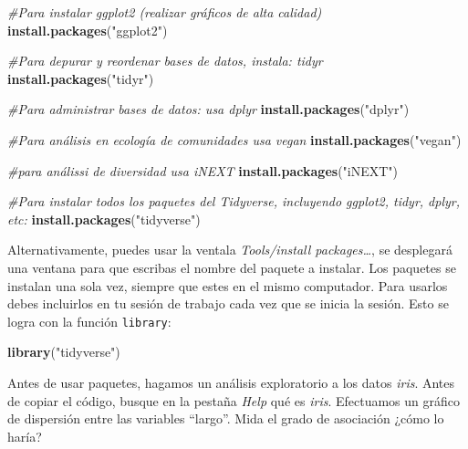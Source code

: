 \documentclass[]{article}
\newenvironment{Shaded}{\begin{snugshade}}{\end{snugshade}}
\newcommand{\CommentTok}[1]{\textcolor[rgb]{0.56,0.35,0.01}{\textit{#1}}}
\newcommand{\KeywordTok}[1]{\textcolor[rgb]{0.13,0.29,0.53}{\textbf{#1}}}
\newcommand{\NormalTok}[1]{#1}
\newcommand{\OperatorTok}[1]{\textcolor[rgb]{0.81,0.36,0.00}{\textbf{#1}}}
\newcommand{\StringTok}[1]{\textcolor[rgb]{0.31,0.60,0.02}{#1}}
\begin{document}
\begin{Shaded}
\begin{Highlighting}[]
\CommentTok{#Para instalar ggplot2 (realizar gráficos de alta calidad)}
\KeywordTok{install.packages}\NormalTok{(}\StringTok{"ggplot2"}\NormalTok{)}

\CommentTok{#Para depurar y reordenar bases de datos, instala: tidyr}
\KeywordTok{install.packages}\NormalTok{(}\StringTok{"tidyr"}\NormalTok{)}

\CommentTok{#Para administrar bases de datos: usa dplyr}
\KeywordTok{install.packages}\NormalTok{(}\StringTok{"dplyr"}\NormalTok{)}

\CommentTok{#Para análisis en ecología de comunidades usa vegan}
\KeywordTok{install.packages}\NormalTok{(}\StringTok{"vegan"}\NormalTok{)}

\CommentTok{#para análissi de diversidad usa iNEXT}
\KeywordTok{install.packages}\NormalTok{(}\StringTok{"iNEXT"}\NormalTok{)}

\CommentTok{#Para instalar todos los paquetes del Tidyverse, incluyendo ggplot2, tidyr, dplyr, etc:}
\KeywordTok{install.packages}\NormalTok{(}\StringTok{"tidyverse"}\NormalTok{)}
\end{Highlighting}
\end{Shaded}

Alternativamente, puedes usar la ventala \emph{Tools/install
packages\ldots{}}, se desplegará una ventana para que escribas el nombre
del paquete a instalar. Los paquetes se instalan una sola vez, siempre
que estes en el mismo computador. Para usarlos debes incluirlos en tu
sesión de trabajo cada vez que se inicia la sesión. Esto se logra con la
función \texttt{library}:

\begin{Shaded}
\begin{Highlighting}[]
\KeywordTok{library}\NormalTok{(}\StringTok{"tidyverse"}\NormalTok{)}
\end{Highlighting}
\end{Shaded}

Antes de usar paquetes, hagamos un análisis exploratorio a los datos
\emph{iris}. Antes de copiar el código, busque en la pestaña \emph{Help}
qué es \emph{iris}. Efectuamos un gráfico de dispersión entre las
variables ``largo''. Mida el grado de asociación ¿cómo lo haría?

\begin{Shaded}
\end{Shaded}
\end{document}
